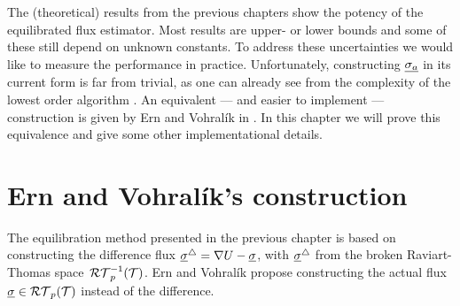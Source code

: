 \documentclass[thesis.tex]{subfiles}
\begin{document}
The (theoretical) results from the previous chapters show the potency of the equilibrated flux estimator. 
Most results are upper- or lower bounds and some of these still depend on unknown constants.
To address these uncertainties we would like to measure the performance in practice.
Unfortunately, constructing $\underline{\sigma_a}$ in its current form is far from trivial, as one can already see from
the complexity of the lowest order algorithm \cite[Alg~4]{braess2006equilibrated}.
An equivalent --- and easier to implement --- construction is given by Ern and Vohral\'ik in \cite{ernequil}. In this
chapter we will prove this equivalence and give some other implementational details.

\section{Ern and Vohral\'ik's construction}
The equilibration method presented in the previous chapter is based on constructing the difference flux $\underline{\sigma}^\triangle 
= \nabla U - \underline{\sigma}$, 
with $\underline{\sigma}^\triangle$ from the broken Raviart-Thomas space~$\mathcal{RT}_p^{-1}(\mathcal{T})$. 
Ern and Vohral\'ik \cite{ernequil} propose constructing the actual flux $\underline{\sigma} \in \mathcal{RT}_p(\mathcal{T})$ instead of the difference.
\end{document}
